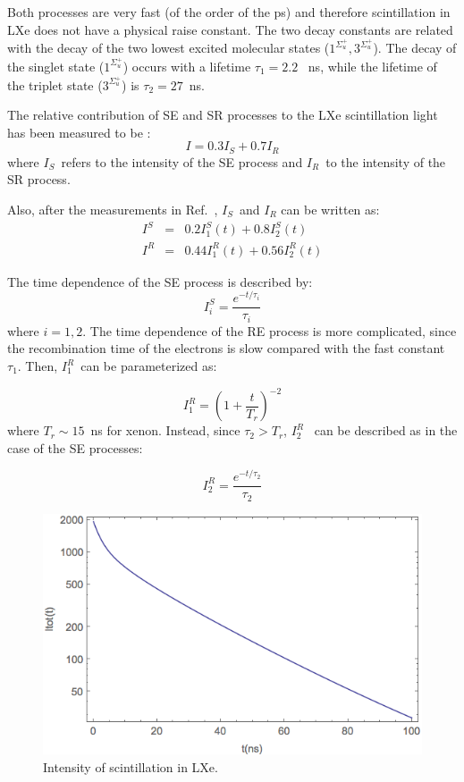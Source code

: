 \documentclass[review]{elsarticle}
\begin{document}
Both processes are very fast (of the order of the ps) and therefore scintillation in LXe does not have a physical raise constant. The two decay constants are related with the decay of the two lowest excited molecular states 
($1^{\Sigma_u^+},3^{\Sigma_u^+}$). The decay of the singlet state 
($1^{\Sigma_u^+}$) occurs with a lifetime $\tau_1 =2.2$~ ns, while the lifetime of the triplet state ($3^{\Sigma_u^+}$) is $\tau_2 =27$~ns.

The relative contribution of SE and SR processes to the LXe scintillation light has been measured to be \cite{Kubota79}:
\begin{equation}
I = 0.3 I_S + 0.7 I_R
\end{equation}
%
where $I_S$~refers to the intensity of the SE process and $I_R$~to the intensity of the SR process.

Also, after the measurements in Ref.~\cite{Kubota79}, $I_S$~and $I_R$ can be written as:
\begin{eqnarray}
I^S & = & 0.2 I_1^S(t) +  0.8 I_2^S(t) \\
 I^R & = & 0.44 I_1^R(t) +  0.56 I_2^R(t)
\end{eqnarray}

The time dependence of the SE process is described by:
\begin{equation}
I^S_i = \frac{e^{-t/\tau_i}}{\tau_i}
\end{equation}
%
where $i=1,2$. The time dependence of the RE process is more complicated, since the recombination time
of the electrons is slow compared with the fast constant $\tau_1$. Then, $I^R_1$~can be parameterized \cite{Kubota79} as: 

\begin{equation}
I^R_1 =(1 + \frac{t}{T_r})^{-2}
\end{equation}
%
where $T_r \sim 15$~ns for xenon. Instead, since $\tau_2 > T_r$, $I^R_2$~ can be described as in the case of the SE processes: 

\begin{equation}
I^R_2 =\frac{e^{-t/\tau_2}}{\tau_2}
\end{equation}

\begin{figure}[!bhtp]
	\centering
	\includegraphics[scale=0.6]{../img/LXeScintillation2.png}
	\caption{\label{fig.scint} Intensity of scintillation in LXe. }
\end{figure}
\end{document}
